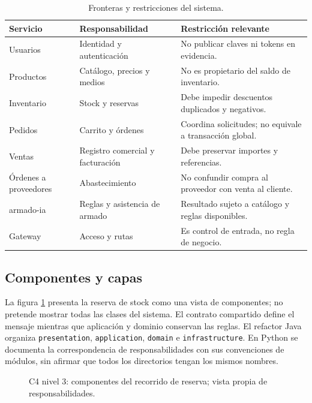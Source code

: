 \documentclass[12pt,a4paper]{article}
\begin{document}
\begin{table}[H]\centering\small
\caption{Fronteras y restricciones del sistema.}\label{tab:fronteras}
\begin{tabularx}{\textwidth}{lXX}
\toprule Servicio & Responsabilidad & Restricción relevante\\\midrule
Usuarios & Identidad y autenticación & No publicar claves ni tokens en evidencia.\\
Productos & Catálogo, precios y medios & No es propietario del saldo de inventario.\\
Inventario & Stock y reservas & Debe impedir descuentos duplicados y negativos.\\
Pedidos & Carrito y órdenes & Coordina solicitudes; no equivale a transacción global.\\
Ventas & Registro comercial y facturación & Debe preservar importes y referencias.\\
Órdenes a proveedores & Abastecimiento & No confundir compra al proveedor con venta al cliente.\\
armado-ia & Reglas y asistencia de armado & Resultado sujeto a catálogo y reglas disponibles.\\
Gateway & Acceso y rutas & Es control de entrada, no regla de negocio.\\\bottomrule
\end{tabularx}
\end{table}

\subsection{Componentes y capas}
La figura \ref{fig:componentes} presenta la reserva de stock como una vista de componentes; no pretende mostrar todas las clases del sistema. El contrato compartido define el mensaje mientras que aplicación y dominio conservan las reglas. El refactor Java organiza \texttt{presentation}, \texttt{application}, \texttt{domain} e \texttt{infrastructure}. En Python se documenta la correspondencia de responsabilidades con sus convenciones de módulos, sin afirmar que todos los directorios tengan los mismos nombres.

\begin{figure}[H]\centering
{}
\caption{C4 nivel 3: componentes del recorrido de reserva; vista propia de responsabilidades.}\label{fig:componentes}
\end{figure}
\end{document}
